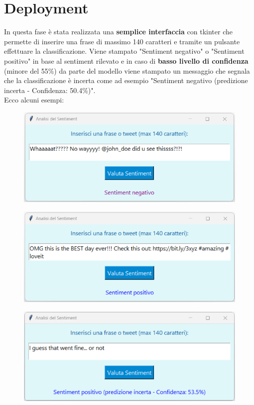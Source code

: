 \documentclass[12pt,a4paper]{report} %
\begin{document}
\chapter{Deployment}
In questa fase è stata realizzata una \textbf{semplice interfaccia} con tkinter che permette di inserire una frase di massimo 140 caratteri e tramite un pulsante effettuare la classificazione. Viene stampato "Sentiment negativo" o "Sentiment positivo" in base al sentiment rilevato e in caso di \textbf{basso livello di confidenza} (minore del 55\%) da parte del modello viene stampato un messaggio che segnala che la classificazione è incerta come ad esempio "Sentiment negativo (predizione incerta - Confidenza: 50.4\%)".\\Ecco alcuni esempi:
\begin{figure}[H]
    \centering
    \includegraphics[width=0.75\linewidth]{immagini/sentimentnegativo.png}
    
    
\end{figure}
\begin{figure}[H]
    \centering
    \includegraphics[width=0.75\linewidth]{immagini/sentimentpositivo.png}
    
    
\end{figure}
\begin{figure}[H]
    \centering
    \includegraphics[width=0.75\linewidth]{immagini_modeling/incerta.png}
\end{figure}
\end{document}

